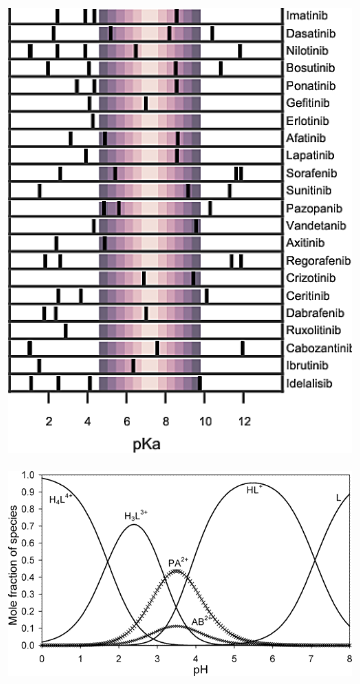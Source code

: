 \documentclass[10pt,final]{article}
\begin{document}
\begin{figure}[H]
\centering
\begin{subfigure}{.48\textwidth}
  \centering
	\includegraphics[width=0.95\linewidth]{figures/inhibitor-pKas.png}
	\caption{}
	\label{figure:pka-kinase}
\end{subfigure}%
\hfill{}
\begin{subfigure}{.48\textwidth}
  \centering
  \includegraphics[width=0.95\linewidth]{figures/imatinib_curve.png}

\end{subfigure}
\end{figure}
\end{document}
